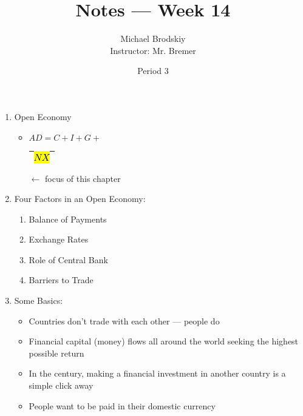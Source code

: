 \documentclass[12pt]{article}
\title{Notes — Week 14}
\date{Period 3}
\author{Michael Brodskiy\\ \small Instructor: Mr. Bremer}
\begin{document}
\maketitle

\begin{enumerate}

  \item Open Economy

    \begin{itemize}

      \item $AD = C + I + G + $\begin{tabular}{|c|}\hline \hl{$NX$}\\ \hline \end{tabular}$\longleftarrow$ focus of this chapter 

    \end{itemize}

  \item Four Factors in an Open Economy:

    \begin{enumerate}

      \item Balance of Payments

      \item Exchange Rates

      \item Role of Central Bank

      \item Barriers to Trade

    \end{enumerate}

  \item Some Basics:

    \begin{itemize}

      \item Countries don't trade with each other — people do

      \item Financial capital (money) flows all around the world seeking the highest possible return

      \item In the  century, making a financial investment in another country is a simple click away

      \item People want to be paid in their domestic currency

    \end{itemize}


\end{enumerate}
\end{document}
